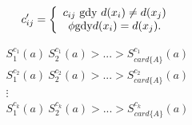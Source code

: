 \documentclass[a4paper,12pt]{article}
\begin{document}
\begin{equation}
c'_{ij}= \left\{ 
\begin{array}{c}
c_{ij} \ \textnormal{gdy} \ d(x_i) \neq d(x_j) \\
\phi \textnormal{gdy} d(x_i)=d(x_j).
\end{array} \right.
\end{equation}

\begin{algorithmic}
\ENDIF
\ENDIF
\ENDFOR
{}
\ENDIF
\ENDFOR
{}
\end{algorithmic}

$$
\left. \begin{array}{c}
S^{c_1}_1(a)\>S^{c_1}_2(a)>...>S^{c_1}_{card\{A\}}(a) \\
S^{c_2}_1(a)\>S^{c_2}_2(a)>...>S^{c_2}_{card\{A\}}(a) \\
\vdots \\
S^{c_k}_1(a)\>S^{c_k}_2(a)>...>S^{c_k}_{card\{A\}}(a) \\
\end{array}\right.
$$
\end{document}
